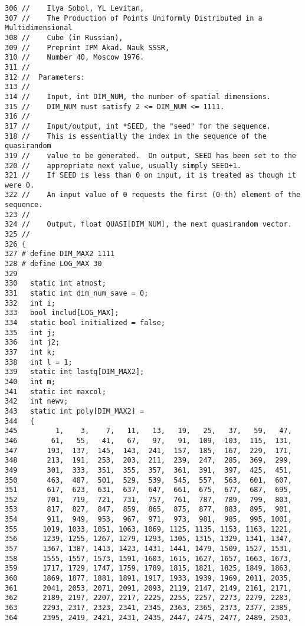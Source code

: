 \begin{Code}
\begin{verbatim}
306 //    Ilya Sobol, YL Levitan, 
307 //    The Production of Points Uniformly Distributed in a Multidimensional 
308 //    Cube (in Russian),
309 //    Preprint IPM Akad. Nauk SSSR, 
310 //    Number 40, Moscow 1976.
311 //
312 //  Parameters:
313 //
314 //    Input, int DIM_NUM, the number of spatial dimensions.
315 //    DIM_NUM must satisfy 2 <= DIM_NUM <= 1111.
316 //
317 //    Input/output, int *SEED, the "seed" for the sequence.
318 //    This is essentially the index in the sequence of the quasirandom
319 //    value to be generated.  On output, SEED has been set to the
320 //    appropriate next value, usually simply SEED+1.
321 //    If SEED is less than 0 on input, it is treated as though it were 0.
322 //    An input value of 0 requests the first (0-th) element of the sequence.
323 //
324 //    Output, float QUASI[DIM_NUM], the next quasirandom vector.
325 //
326 {
327 # define DIM_MAX2 1111
328 # define LOG_MAX 30
329 
330   static int atmost;
331   static int dim_num_save = 0;
332   int i;
333   bool includ[LOG_MAX];
334   static bool initialized = false;
335   int j;
336   int j2;
337   int k;
338   int l = 1;
339   static int lastq[DIM_MAX2];
340   int m;
341   static int maxcol;
342   int newv;
343   static int poly[DIM_MAX2] =
344   {
345         1,    3,    7,   11,   13,   19,   25,   37,   59,   47,
346        61,   55,   41,   67,   97,   91,  109,  103,  115,  131,
347       193,  137,  145,  143,  241,  157,  185,  167,  229,  171,
348       213,  191,  253,  203,  211,  239,  247,  285,  369,  299,
349       301,  333,  351,  355,  357,  361,  391,  397,  425,  451,
350       463,  487,  501,  529,  539,  545,  557,  563,  601,  607,
351       617,  623,  631,  637,  647,  661,  675,  677,  687,  695, 
352       701,  719,  721,  731,  757,  761,  787,  789,  799,  803,
353       817,  827,  847,  859,  865,  875,  877,  883,  895,  901,
354       911,  949,  953,  967,  971,  973,  981,  985,  995, 1001,
355      1019, 1033, 1051, 1063, 1069, 1125, 1135, 1153, 1163, 1221,
356      1239, 1255, 1267, 1279, 1293, 1305, 1315, 1329, 1341, 1347,
357      1367, 1387, 1413, 1423, 1431, 1441, 1479, 1509, 1527, 1531,
358      1555, 1557, 1573, 1591, 1603, 1615, 1627, 1657, 1663, 1673, 
359      1717, 1729, 1747, 1759, 1789, 1815, 1821, 1825, 1849, 1863,
360      1869, 1877, 1881, 1891, 1917, 1933, 1939, 1969, 2011, 2035,
361      2041, 2053, 2071, 2091, 2093, 2119, 2147, 2149, 2161, 2171,
362      2189, 2197, 2207, 2217, 2225, 2255, 2257, 2273, 2279, 2283,
363      2293, 2317, 2323, 2341, 2345, 2363, 2365, 2373, 2377, 2385,
364      2395, 2419, 2421, 2431, 2435, 2447, 2475, 2477, 2489, 2503, 

\end{verbatim}
\end{Code}
